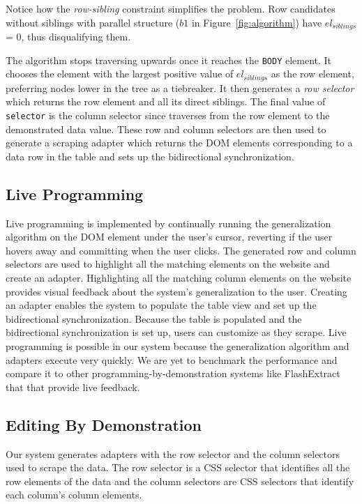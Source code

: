 \documentclass[sigconf,10pt]{acmart}
\begin{document}
Notice how the \emph{row-sibling} constraint simplifies the problem. Row
candidates without siblings with parallel structure (\(b1\) in
Figure~\ref{fig:algorithm}) have \(el_{siblings}\) = 0, thus
disqualifying them.

The algorithm stops traversing upwards once it reaches the \texttt{BODY}
element. It chooses the element with the largest positive value of
\(el_{siblings}\) as the row element, preferring nodes lower in the tree
as a tiebreaker. It then generates a \emph{row selector} which returns
the row element and all its direct siblings. The final value of
\texttt{selector} is the column selector since traverses from the row
element to the demonstrated data value. These row and column selectors
are then used to generate a scraping adapter which returns the DOM
elements corresponding to a data row in the table and sets up the
bidirectional synchronization.

\hypertarget{live-programming}{%
\subsection{Live Programming}\label{live-programming}}

Live programming is implemented by continually running the
generalization algorithm on the DOM element under the user's cursor,
reverting if the user hovers away and committing when the user clicks.
The generated row and column selectors are used to highlight all the
matching elements on the website and create an adapter. Highlighting all
the matching column elements on the website provides visual feedback
about the system's generalization to the user. Creating an adapter
enables the system to populate the table view and set up the
bidirectional synchronization. Because the table is populated and the
bidirectional synchronization is set up, users can customize as they
scrape. Live programming is possible in our system because the
generalization algorithm and adapters execute very quickly. We are yet
to benchmark the performance and compare it to other
programming-by-demonstration systems like FlashExtract \citep{le2014}
that that provide live feedback.

\hypertarget{editing-by-demonstration}{%
\subsection{Editing By Demonstration}\label{editing-by-demonstration}}

Our system generates adapters with the row selector and the column
selectors used to scrape the data. The row selector is a CSS selector
that identifies all the row elements of the data and the column
selectors are CSS selectors that identify each column's column elements.
\end{document}

